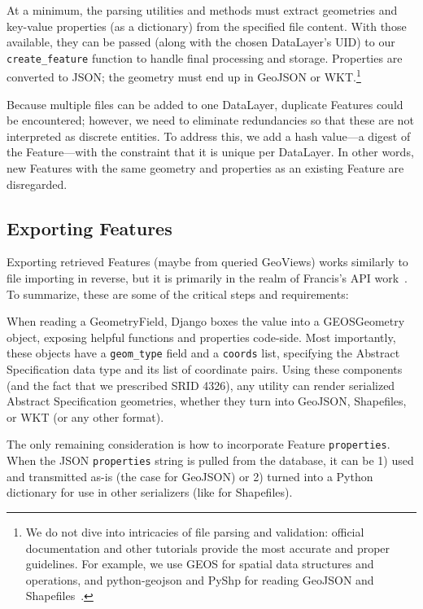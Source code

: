At a minimum, the parsing utilities and methods must extract geometries and key-value properties (as a dictionary) from the specified file content. With those available, they can be passed (along with the chosen DataLayer's UID) to our \texttt{create\_feature} function to handle final processing and storage. Properties are converted to JSON; the geometry must end up in GeoJSON or WKT.\footnote{We do not dive into intricacies of file parsing and validation: official documentation and other tutorials provide the most accurate and proper guidelines. For example, we use GEOS for spatial data structures and operations, and python-geojson and PyShp for reading GeoJSON and Shapefiles~\cite{GEOS,Farwell2014,pyshp}.}

Because multiple files can be added to one DataLayer, duplicate Features could be encountered; however, we need to eliminate redundancies so that these are not interpreted as discrete entities. To address this, we add a hash value---a digest of the Feature---with the constraint that it is unique per DataLayer. In other words, new Features with the same geometry and properties as an existing Feature are disregarded.

\subsection{Exporting Features}
\label{sec:export}
Exporting retrieved Features (maybe from queried GeoViews) works similarly to file importing in reverse, but it is primarily in the realm of Francis's API work~\cite{Francis}. To summarize, these are some of the critical steps and requirements:

When reading a GeometryField, Django boxes the value into a GEOSGeometry object, exposing helpful functions and properties code-side. Most importantly, these objects have a \texttt{geom\_type} field and a \texttt{coords} list, specifying the Abstract Specification data type and its list of coordinate pairs. Using these components (and the fact that we prescribed SRID 4326), any utility can render serialized Abstract Specification geometries, whether they turn into GeoJSON, Shapefiles, or WKT (or any other format).

The only remaining consideration is how to incorporate Feature \texttt{properties}. When the JSON \texttt{properties} string is pulled from the database, it can be 1) used and transmitted as-is (the case for GeoJSON) or 2) turned into a Python dictionary for use in other serializers (like for Shapefiles).

